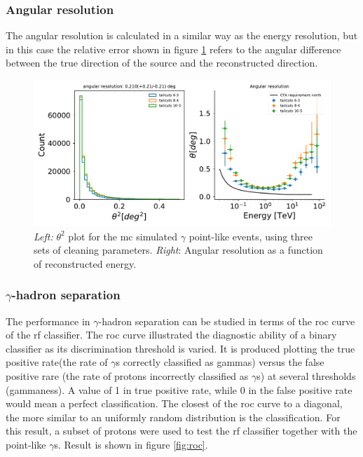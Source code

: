 \documentclass[main.tex]{subfiles}
\begin{document}
\subsubsection{Angular resolution}

The angular resolution is calculated in a similar way as the energy resolution, but in this case the relative error shown in figure \ref{fig:angres} refers to the angular difference between the true direction of the source and the reconstructed direction. 


\begin{figure}
\centering
 \includegraphics[width=1\textwidth]{Pictures/angular_resolution.pdf}
  \caption{\textit{Left:} $\theta^2$ plot for the \gls{mc} simulated $\gamma$ point-like events, using three sets of cleaning parameters. \textit{Right}: Angular resolution as a function of reconstructed energy.}
    \label{fig:angres}
\end{figure}

\subsubsection{$\gamma$-hadron separation}

The performance in $\gamma$-hadron separation can be studied in terms of the \gls{roc} curve of the \gls{rf} classifier. The \gls{roc} curve illustrated the diagnostic ability of a binary classifier as its discrimination threshold is varied. It is produced plotting the true positive rate(the rate of $\gamma$s correctly classified as gammas) versus the false positive rare (the rate of protons incorrectly classified as $\gamma$s) at several thresholds (gammaness). A value of 1 in true positive rate, while 0 in the false positive rate would mean a perfect classification. The closest of the \gls{roc} curve to a diagonal, the more similar to an uniformly random distribution is the classification. For this result, a subset of protons were used to test the \gls{rf} classifier together with the point-like $\gamma$s. Result is shown in figure \ref{fig:roc}.
\end{document}
